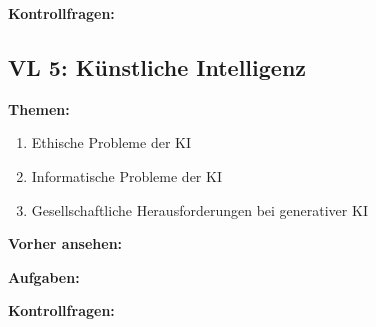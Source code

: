 \documentclass[a4paper]{article}%
\begin{document}
\textbf{Kontrollfragen:}



\clearpage
\subsection{VL 5: Künstliche Intelligenz}


\textbf{Themen:}

\begin{enumerate}
\item Ethische Probleme der KI
\item Informatische Probleme der KI
\item Gesellschaftliche Herausforderungen bei generativer KI
\end{enumerate}


\bigskip

\textbf{Vorher ansehen:}



\bigskip

\textbf{Aufgaben:}


\bigskip


\textbf{Kontrollfragen:}
\end{document}
